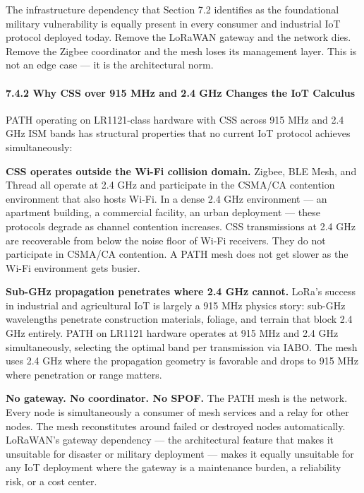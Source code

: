 \documentclass[
  11pt,
]{article}
\begin{document}
The infrastructure dependency that Section 7.2 identifies as the
foundational military vulnerability is equally present in every consumer
and industrial IoT protocol deployed today. Remove the LoRaWAN gateway
and the network dies. Remove the Zigbee coordinator and the mesh loses
its management layer. This is not an edge case --- it is the
architectural norm.

\hypertarget{why-css-over-915-mhz-and-2.4-ghz-changes-the-iot-calculus}{%
\paragraph{7.4.2 Why CSS over 915 MHz and 2.4 GHz Changes the IoT
Calculus}\label{why-css-over-915-mhz-and-2.4-ghz-changes-the-iot-calculus}}

PATH operating on LR1121-class hardware with CSS across 915 MHz and 2.4
GHz ISM bands has structural properties that no current IoT protocol
achieves simultaneously:

\textbf{CSS operates outside the Wi-Fi collision domain.} Zigbee, BLE
Mesh, and Thread all operate at 2.4 GHz and participate in the CSMA/CA
contention environment that also hosts Wi-Fi. In a dense 2.4 GHz
environment --- an apartment building, a commercial facility, an urban
deployment --- these protocols degrade as channel contention increases.
CSS transmissions at 2.4 GHz are recoverable from below the noise floor
of Wi-Fi receivers. They do not participate in CSMA/CA contention. A
PATH mesh does not get slower as the Wi-Fi environment gets busier.

\textbf{Sub-GHz propagation penetrates where 2.4 GHz cannot.} LoRa's
success in industrial and agricultural IoT is largely a 915 MHz physics
story: sub-GHz wavelengths penetrate construction materials, foliage,
and terrain that block 2.4 GHz entirely. PATH on LR1121 hardware
operates at 915 MHz and 2.4 GHz simultaneously, selecting the optimal
band per transmission via IABO. The mesh uses 2.4 GHz where the
propagation geometry is favorable and drops to 915 MHz where penetration
or range matters.

\textbf{No gateway. No coordinator. No SPOF.} The PATH mesh is the
network. Every node is simultaneously a consumer of mesh services and a
relay for other nodes. The mesh reconstitutes around failed or destroyed
nodes automatically. LoRaWAN's gateway dependency --- the architectural
feature that makes it unsuitable for disaster or military deployment ---
makes it equally unsuitable for any IoT deployment where the gateway is
a maintenance burden, a reliability risk, or a cost center.
\end{document}
